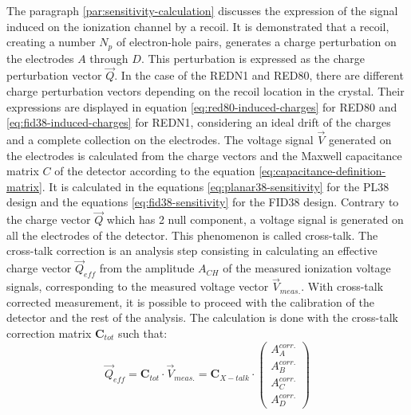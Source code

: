 The paragraph \ref{par:sensitivity-calculation} discusses the expression of the signal induced on the ionization channel by a recoil. It is demonstrated that a recoil, creating a number $N_p$ of electron-hole pairs, generates a charge perturbation on the electrodes $A$ through $D$. This perturbation is expressed as the charge perturbation vector $\vec{Q}$. In the case of the REDN1 and RED80, there are different charge perturbation vectors depending on the recoil location in the crystal. Their expressions are displayed in equation \ref{eq:red80-induced-charges} for RED80 and \ref{eq:fid38-induced-charges} for REDN1, considering an ideal drift of the charges and a complete collection on the electrodes.
The voltage signal $\vec{V}$ generated on the electrodes is calculated from the charge vectors and the Maxwell capacitance matrix $C$ of the detector according to the equation \ref{eq:capacitance-definition-matrix}. It is calculated in the equations \ref{eq:planar38-sensitivity} for the PL38 design and the equations \ref{eq:fid38-sensitivity} for the FID38 design. Contrary to the charge vector $\vec{Q}$ which has 2 null component, a voltage signal is generated on all the electrodes of the detector. This phenomenon is called cross-talk.
The cross-talk correction is an analysis step consisting in calculating an effective charge vector $\vec{Q}_{eff}$ from the amplitude $A_{CH}$ of the measured ionization voltage signals, corresponding to the measured voltage vector $\vec{V}_{meas.}$. With cross-talk corrected measurement, it is possible to proceed with the calibration of the detector and the rest of the analysis.
The calculation is done with the cross-talk correction matrix $\bm{C}_{tot}$
such that:
\begin{equation}
\label{fig:cross-talk-correction}
\vec{Q}_{eff} = \bm{C}_{tot} \cdot \vec{V}_{meas.} =
\bm{C}_{X-talk} \cdot
\begin{pmatrix}
A_A^{corr.} \\ A_B^{corr.} \\ A_C^{corr.} \\ A_D^{corr.}
\end{pmatrix}
\end{equation}
